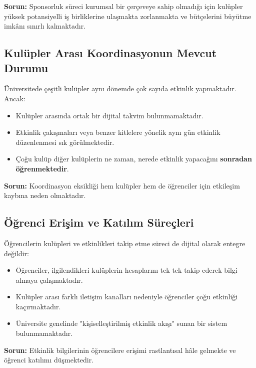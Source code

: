 \documentclass[a4paper,12pt]{report}
\begin{document}
\textbf{Sorun:} Sponsorluk süreci kurumsal bir çerçeveye sahip olmadığı için kulüpler yüksek potansiyelli iş birliklerine ulaşmakta zorlanmakta ve bütçelerini büyütme imkânı sınırlı kalmaktadır.

\subsection{Kulüpler Arası Koordinasyonun Mevcut Durumu}

Üniversitede çeşitli kulüpler aynı dönemde çok sayıda etkinlik yapmaktadır. Ancak:

\begin{itemize}
    \item Kulüpler arasında ortak bir dijital takvim bulunmamaktadır.

    \item Etkinlik çakışmaları veya benzer kitlelere yönelik aynı gün etkinlik düzenlenmesi sık görülmektedir.

    \item Çoğu kulüp diğer kulüplerin ne zaman, nerede etkinlik yapacağını \textbf{sonradan öğrenmektedir}.
\end{itemize}

\textbf{Sorun:} Koordinasyon eksikliği hem kulüpler hem de öğrenciler için etkileşim kaybına neden olmaktadır.

\subsection{Öğrenci Erişim ve Katılım Süreçleri}

Öğrencilerin kulüpleri ve etkinlikleri takip etme süreci de dijital olarak entegre değildir:

\begin{itemize}
    \item Öğrenciler, ilgilendikleri kulüplerin hesaplarını tek tek takip ederek bilgi almaya çalışmaktadır.

    \item Kulüpler arası farklı iletişim kanalları nedeniyle öğrenciler çoğu etkinliği kaçırmaktadır.

    \item Üniversite genelinde "kişiselleştirilmiş etkinlik akışı" sunan bir sistem bulunmamaktadır.
\end{itemize}

\textbf{Sorun:} Etkinlik bilgilerinin öğrencilere erişimi rastlantısal hâle gelmekte ve öğrenci katılımı düşmektedir.
\end{document}
